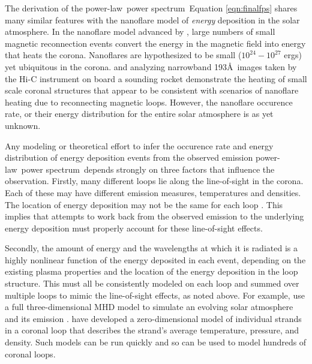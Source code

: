 \documentclass[onecolumn]{emulateapj}
\newcommand{\PS}{power spectrum}
\newcommand{\PL}{power-law}
\begin{document}
The derivation of the \PL\ \PS\ Equation \ref{eqn:finalfps} shares
many similar features with the nanoflare model of {\it energy}
deposition in the solar atmosphere. In the nanoflare model advanced by
\cite{1988ApJ...330..474P}, large numbers of small magnetic
reconnection events convert the energy in the magnetic field into
energy that heats the corona.  Nanoflares are hypothesized to be small
($10^{24}-10^{27}$ ergs) yet ubiquitous in the corona.
\cite{2013ApJ...771...21W} and \cite{2013ApJ...770L...1T} analyzing
narrowband 193\AA\ images taken by the Hi-C instrument on board a
sounding rocket demonstrate the heating of small scale coronal
structures that appear to be consistent with scenarios of nanoflare
heating due to reconnecting magnetic loops.  However, the nanoflare
occurence rate, or their energy distribution for the entire solar
atmosphere is as yet unknown.

Any modeling or theoretical effort to infer the occurence rate and
energy distribution of energy deposition events from the observed
emission \PL\ \PS\ depends strongly on three factors that influence
the observation.  Firstly, many different loops lie along the
line-of-sight in the corona.  Each of these may have different
emission measures, temperatures and densities.  The location of energy
deposition may not be the same for each loop
\citep{2003A&ARv..12....1W, 2006SoPh..234...41K}.  This implies that
attempts to work back from the observed emission to the underlying
energy deposition must properly account for these line-of-sight
effects.

Secondly, the amount of energy and the wavelengths at which it is
radiated is a highly nonlinear function of the energy deposited in
each event, depending on the existing plasma properties and the
location of the energy deposition in the loop structure.  This must
all be consistently modeled on each loop and summed over multiple
loops to mimic the line-of-sight effects, as noted above.  For
example, \cite{2011ApJ...743...23M} use a full three-dimensional MHD
model to simulate an evolving solar atmosphere and its emission
\citep{2011AA...531A.154G}.  \cite{2008ApJ...682.1351K,
  0004-637X-752-2-161} have developed a zero-dimensional model of
individual strands in a coronal loop that describes the strand's
average temperature, pressure, and density.  Such models can be run
quickly and so can be used to model hundreds of coronal loops.
\end{document}
